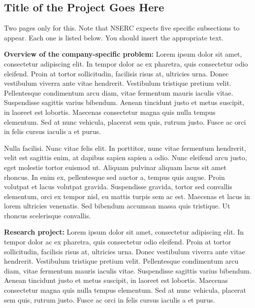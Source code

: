 \documentclass[12pt]{article}
\begin{document}
\setcounter{page}{8}  %

\subsection*{Title of the Project Goes Here}

Two pages only for this. Note that NSERC expects five specific subsections to appear. Each one is listed below. You should insert the appropriate text. \vskip 2mm

\noindent
{\bf Overview of the company-specific problem:}
 Lorem ipsum dolor sit amet, consectetur adipiscing elit. In tempor dolor ac ex pharetra, quis consectetur odio eleifend. Proin at tortor sollicitudin, facilisis risus at, ultricies urna. Donec vestibulum viverra ante vitae hendrerit. Vestibulum tristique pretium velit. Pellentesque condimentum arcu diam, vitae fermentum mauris iaculis vitae. Suspendisse sagittis varius bibendum. Aenean tincidunt justo et metus suscipit, in laoreet est lobortis. Maecenas consectetur magna quis nulla tempus elementum. Sed at nunc vehicula, placerat sem quis, rutrum justo. Fusce ac orci in felis cursus iaculis a et purus.

Nulla facilisi. Nunc vitae felis elit. In porttitor, nunc vitae fermentum hendrerit, velit est sagittis enim, at dapibus sapien sapien a odio. Nunc eleifend arcu justo, eget molestie tortor euismod ut. Aliquam pulvinar aliquam lacus sit amet rhoncus. In enim ex, pellentesque sed auctor a, tempus quis augue. Proin volutpat et lacus volutpat gravida. Suspendisse gravida, tortor sed convallis elementum, orci ex tempor nisl, eu mattis turpis sem ac est. Maecenas et lacus in lorem ultricies venenatis. Sed bibendum accumsan massa quis tristique. Ut rhoncus scelerisque convallis. 
 

\vskip 2mm
\noindent
{\bf Research project:}
 Lorem ipsum dolor sit amet, consectetur adipiscing elit. In tempor dolor ac ex pharetra, quis consectetur odio eleifend. Proin at tortor sollicitudin, facilisis risus at, ultricies urna. Donec vestibulum viverra ante vitae hendrerit. Vestibulum tristique pretium velit. Pellentesque condimentum arcu diam, vitae fermentum mauris iaculis vitae. Suspendisse sagittis varius bibendum. Aenean tincidunt justo et metus suscipit, in laoreet est lobortis. Maecenas consectetur magna quis nulla tempus elementum. Sed at nunc vehicula, placerat sem quis, rutrum justo. Fusce ac orci in felis cursus iaculis a et purus.
\end{document}
